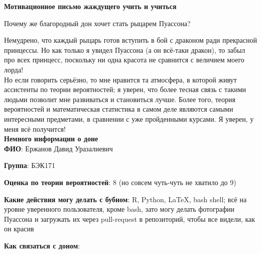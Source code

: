 \documentclass[12pt]{article} %
\theoremstyle{definition} %
\begin{document}
\begin{center}
	\textbf{\large Мотивационное письмо жаждущего учить и учиться}
\end{center}

Почему же благородный дон хочет стать рыцарем Пуассона?

Немудрено, что каждый рыцарь готов вступить в бой с драконом ради прекрасной принцессы. Но как только я увидел Пуассона (а он всё-таки дракон), то забыл про всех принцесс, поскольку ни одна красота не сравнится с величием моего лорда! \\

Но если говорить серьёзно, то мне нравится та атмосфера, в которой живут ассистенты по теории вероятностей; я уверен, что более тесная связь с такими людьми позволит мне развиваться и становиться лучше. Более того, теория вероятностей и математическая статистика в самом деле являются самыми интересными предметами, в сравнении с уже пройденными курсами. Я уверен, у меня всё получится! \\

\textbf{Немного информации о доне} \\

\textbf{ФИО}: Ержанов Давид Уразалиевич

\textbf{Группа}: БЭК171

\textbf{Оценка по теории вероятностей}: 8 (но совсем чуть-чуть не хватило до 9)

\textbf{Какие действия могу делать с бубном}: R, Python, LaTeX, bash shell; всё на уровне уверенного пользователя, кроме bash, зато могу делать фотографии Пуассона и загружать их через pull-request в репозиторий, чтобы все видели, как он красив

\textbf{Как связаться с доном}:  \\
\end{document}
